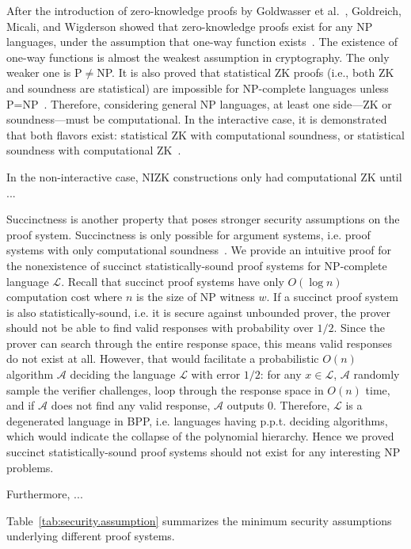 \documentclass[acmtog]{acmart}
\newcommand{\cA}{\mathcal{A}}
\newcommand{\cL}{\mathcal{L}}
\begin{document}
After the introduction of zero-knowledge proofs by Goldwasser et al.~\cite{GoldwasserMR85}, Goldreich, Micali, and Wigderson showed that zero-knowledge proofs exist for any NP languages, under the assumption that one-way function exists~\cite{GoldreichMW86}.
The existence of one-way functions is almost the weakest assumption in cryptography.
The only weaker one is P$\neq$NP.
It is also proved that statistical ZK proofs (i.e., both ZK and soundness are statistical) are impossible for NP-complete languages unless P=NP~\cite{AielloH87, Fortnow87, Passs05}.
Therefore, considering general NP languages, at least one side---ZK or soundness---must be computational.
In the interactive case, it is demonstrated that both flavors exist: statistical ZK with computational soundness, or statistical soundness with computational ZK~\cite{BrassardCC88, BrassardC86, GoldreichMW86}.

In the non-interactive case, NIZK constructions only had computational ZK until ...

Succinctness is another property that poses stronger security assumptions on the proof system.
Succinctness is only possible for argument systems, i.e. proof systems with only computational soundness~\cite{BoppanaHZ87, GoldreichH98, GoldreichVW02, Wee05}.
We provide an intuitive proof for the nonexistence of succinct statistically-sound proof systems for NP-complete language $\cL$.
Recall that succinct proof systems have only $O(\log n)$ computation cost where $n$ is the size of NP witness $w$.
If a succinct proof system is also statistically-sound, i.e. it is secure against unbounded prover, the prover should not be able to find valid responses with probability over $1/2$.
Since the prover can search through the entire response space, this means valid responses do not exist at all.
However, that would facilitate a probabilistic $O(n)$ algorithm $\cA$ deciding the language $\cL$ with error $1/2$: for any $x\in\cL$, $\cA$ randomly sample the verifier challenges, loop through the response space in $O(n)$ time, and if $\cA$ does not find any valid response, $\cA$ outputs $0$.
Therefore, $\cL$ is a degenerated language in BPP, i.e. languages having p.p.t. deciding algorithms, which would indicate the collapse of the polynomial hierarchy.
Hence we proved succinct statistically-sound proof systems should not exist for any interesting NP problems.

Furthermore, ...

Table~\ref{tab:security.assumption} summarizes the minimum security assumptions underlying different proof systems.
\end{document}
